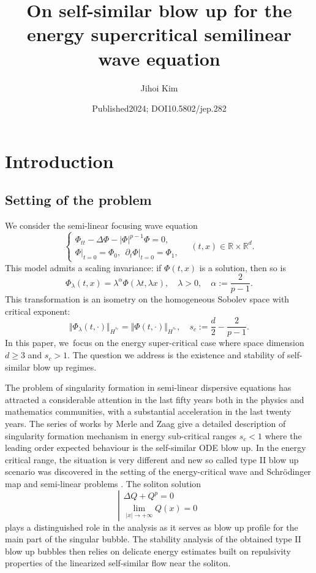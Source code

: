 \documentclass[10pt]{article}
\title{On self-similar blow up for the energy supercritical semilinear wave equation}
\author{Jihoi Kim}
\date{Published2024; DOI10.5802/jep.282}
\theoremstyle{plain}
\theoremstyle{definition}
\begin{document}
\maketitle
\section{Introduction}

\subsection{Setting of the problem} We consider the semi-linear focusing wave equation
\begin{equation}
\label{eq: Nonlinear Wave}
\begin{cases}\Phi_{tt}-\Delta\Phi-|\Phi|^{p-1}\Phi=0,\\
\Phi\big|_{t=0}=\Phi_0,\ \ \partial_t\Phi\big|_{t=0}=\Phi_1,\end{cases}
\quad (t,x) \in \mathbb R\times \mathbb R^d.
\end{equation}
This model admits a scaling invariance: if $\Phi(t,x)$ is a solution, then so is
\[
\Phi_\lambda(t,x)=\lambda^\alpha \Phi(\lambda t,\lambda x),\quad \lambda>0,\quad \alpha:=\frac{2}{p-1}.
\]
This transformation is an isometry on the homogeneous Sobolev space with critical exponent:
\begin{equation}
\label{eq: Critical Scaling}
\Vert \Phi_\lambda(t,\cdot)\Vert_{\dot H^{s_c}}=\Vert \Phi(t,\cdot)\Vert_{\dot H^{s_c}},\quad s_c:=\frac{d}{2}-\frac{2}{p-1}.
\end{equation}
In this paper, we~focus on the energy super-critical case where space dimension $d\ge 3$ and $s_c>1$. The question we address is the existence and stability of self-similar blow up regimes.

The problem of singularity formation in semi-linear dispersive equations has attracted a considerable attention in the last fifty years both in the physics and mathematics communities, with a substantial acceleration in the last twenty years. The series of works by Merle and Zaag \cite{MZ1,MZ2, MZ3, MZ4} give a detailed description of singularity formation mechanism in energy sub-critical ranges $s_c<1$ where the leading order expected behaviour is the self-similar ODE blow up. In the energy critical range, the situation is very different and new so called type II blow up scenario was discovered in the setting of the energy-critical wave and Schrödinger map \cite{KST, RodSter, RaphRod, MRRsch} and semi-linear problems \cite{HR}. The soliton solution
\[
\left|\begin{array}{l}
\Delta Q+Q^p=0\\
\lim_{|x|\to +\infty} Q(x)=0
\end{array}\right.
\]
plays a distinguished role in the analysis as it serves as blow up profile for the main part of the singular bubble. The stability analysis of the obtained type II blow up bubbles then relies on delicate energy estimates built on repulsivity properties of the linearized self-similar flow near the soliton.
\end{document}
